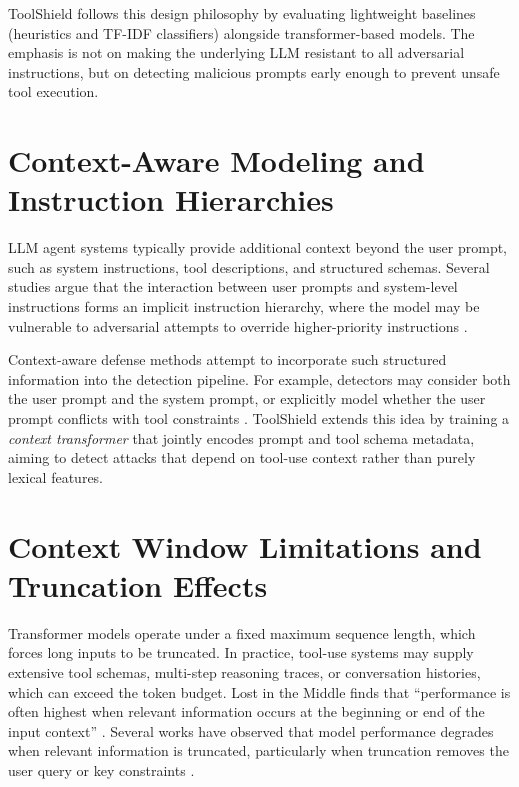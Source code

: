 ToolShield follows this design philosophy by evaluating lightweight baselines (heuristics and TF-IDF classifiers) alongside transformer-based models. The emphasis is not on making the underlying LLM resistant to all adversarial instructions, but on detecting malicious prompts early enough to prevent unsafe tool execution.

\section{Context-Aware Modeling and Instruction Hierarchies}
\label{subsec:rw_context_aware}

LLM agent systems typically provide additional context beyond the user prompt, such as system instructions, tool descriptions, and structured schemas. Several studies argue that the interaction between user prompts and system-level instructions forms an implicit instruction hierarchy, where the model may be vulnerable to adversarial attempts to override higher-priority instructions \cite{instruction_hierarchy}.

Context-aware defense methods attempt to incorporate such structured information into the detection pipeline. For example, detectors may consider both the user prompt and the system prompt, or explicitly model whether the user prompt conflicts with tool constraints \cite{contextual_defenses}. ToolShield extends this idea by training a \emph{context transformer} that jointly encodes prompt and tool schema metadata, aiming to detect attacks that depend on tool-use context rather than purely lexical features.

\section{Context Window Limitations and Truncation Effects}
\label{subsec:rw_truncation}

Transformer models operate under a fixed maximum sequence length, which forces long inputs to be truncated. In practice, tool-use systems may supply extensive tool schemas, multi-step reasoning traces, or conversation histories, which can exceed the token budget. Lost in the Middle finds that \enquote{performance is often highest when relevant information occurs at the beginning or end of the input context} \cite{context_window_limitations}. Several works have observed that model performance degrades when relevant information is truncated, particularly when truncation removes the user query or key constraints \cite{context_window_limitations}.

